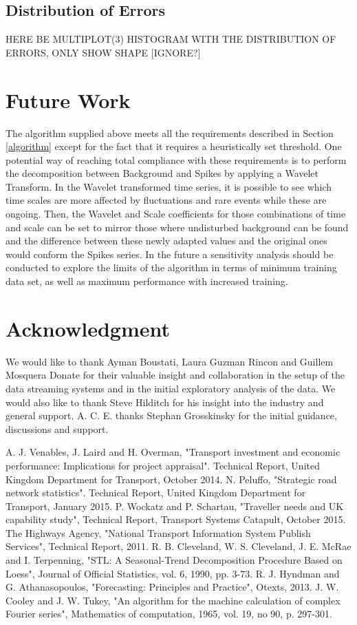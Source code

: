 \documentclass[conference]{IEEEtran}
\begin{document}
\subsection{Distribution of Errors}
HERE BE MULTIPLOT(3) HISTOGRAM WITH THE DISTRIBUTION OF ERRORS, ONLY SHOW SHAPE [IGNORE?]
\section{Future Work}
The algorithm supplied above meets all the requirements described in Section \ref{algorithm} except for the fact that it requires a heuristically set threshold. 
One potential way of reaching total compliance with these requirements is to perform the decomposition between Background and Spikes by applying a Wavelet Transform. 
In the Wavelet transformed time series, it is possible to see which time scales are more affected by fluctuations and rare events while these are ongoing. 
Then, the Wavelet and Scale coefficients for those combinations of time and scale can be set to mirror those where undisturbed background can be found and the difference between these newly adapted values and the original ones would conform the Spikes series.
In the future a sensitivity analysis should be conducted to explore the limits of the algorithm in terms of minimum training data set, as well as maximum performance with increased training.
\section*{Acknowledgment}

We would like to thank Ayman Boustati, Laura Guzman Rincon and Guillem Mosquera Donate for their valuable insight and collaboration in the setup of the data streaming systems and in the initial exploratory analysis of the data. 
We would also like to thank Steve Hilditch for his insight into the industry and general support. 
A. C. E. thanks Stephan Grosskinsky for the initial guidance, discussions and support.


\begin{thebibliography}{00}
 A. J. Venables, J. Laird and H. Overman, "Transport investment and economic performance: Implications for project appraisal". Technical Report, United Kingdom Department for Transport, October 2014.
 N. Peluffo, "Strategic road network statistics". Technical Report, United Kingdom Department for Transport, January 2015.
 P. Wockatz and P. Schartau, "Traveller needs and UK capability study", Technical Report, Transport Systems Catapult, October 2015.
 The Highways Agency, "National Transport Information System Publish Services", Technical Report, 2011. 
 R. B. Cleveland, W. S. Cleveland, J. E. McRae and I. Terpenning, "STL: A Seasonal-Trend Decomposition Procedure Based on Loess", Journal of Official Statistics, vol. 6, 1990, pp. 3-73.
 R. J. Hyndman and G. Athanasopoulos, "Forecasting: Principles and Practice", Otexts, 2013.
 J. W. Cooley and J. W. Tukey, "An algorithm for the machine calculation of complex Fourier series", Mathematics of computation, 1965, vol. 19, no 90, p. 297-301.

\end{thebibliography}
\end{document}
